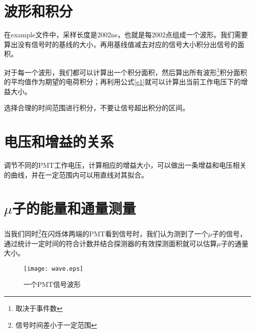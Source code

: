 \documentclass{elegantbook}
\begin{document}
\section{波形和积分}
在example文件中，采样长度是2002ns，也就是每2002点组成一个波形。我们需要算出没有信号时的基线的大小，再用基线值减去对应的信号大小积分出信号的面积。

对于每一个波形，我们都可以计算出一个积分面积，然后算出所有波形\footnote{取决于事件数}积分面积的平均值作为期望的电荷积分；再利用公式\ref{e1}就可以计算出当前工作电压下的增益大小。
\begin{note}
选择合理的时间范围进行积分，不要让信号超出积分的区间。
\end{note}
\section{电压和增益的关系}
调节不同的PMT工作电压，计算相应的增益大小，可以做出一条增益和电压相关的曲线，并在一定范围内可以用直线对其拟合。
\section{$\mu$子的能量和通量测量}
当我们同时\footnote{信号时间差小于一定范围}在闪烁体两端的PMT看到信号时，我们认为测到了一个$\mu$子的信号，通过统计一定时间的符合计数并结合探测器的有效探测面积就可以估算$\mu$子的通量大小。

\begin{figure}[!htbp]
	\centering
	\texttt{[image: wave.eps]}
	\caption{一个PMT信号波形\label{fig:wave}}
\end{figure}
%
%
%

%
%
\end{document}
